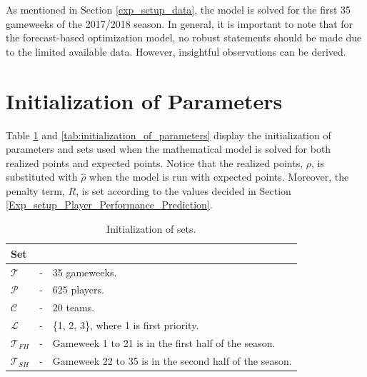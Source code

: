 \newpar

As mentioned in Section \ref{exp_setup_data}, the model is solved for the first 35 gameweeks of the 2017/2018 season. In general, it is important to note that for the forecast-based optimization model, no robust statements should be made due to the limited available data. However, insightful observations can be derived.

\section{Initialization of Parameters}\label{sec:res_init_param}   

Table \ref{tab:initializations_of_sets} and \ref{tab:initialization_of_parameters} display the initialization of parameters and sets used when the mathematical model is solved for both realized points and expected points. Notice that the realized points, $\rho$, is substituted with $\hat{\rho}$ when the model is run with expected points. Moreover, the penalty term, $R$, is set according to the values decided in Section \ref{Exp_setup_Player_Performance_Prediction}.

\begin{table}[H]
\centering

\begin{tabular}{@{}lll@{}}
\toprule
Set           &   &                                                               \\ \midrule
$\mathcal{T}$ & - & 35 gameweeks.                                             \\
$\mathcal{P}$ & - & 625 players.                                              \\
$\mathcal{C}$ & - & 20 teams.                                                 \\
$\mathcal{L}$ & - & \{1, 2, 3\}, where 1 is first priority. \\
$\mathcal{T}_{FH}$ & - & Gameweek 1 to 21 is in the first half of the season. \\
$\mathcal{T}_{SH}$ & - & Gameweek 22 to 35 is in the second half of the season. \\
\bottomrule
\end{tabular}
\caption{Initialization of sets.}
\label{tab:initializations_of_sets}
\end{table}

